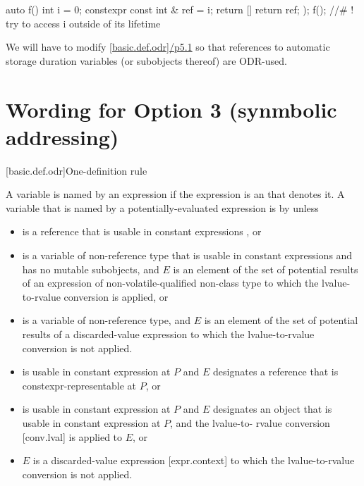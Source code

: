 \documentclass{wg21}
\begin{document}
\begin{colorblock}
auto f() {
    int i = 0;
    constexpr const int & ref = i;
    return [] {
        return ref;
    });
}
f(); //# ! try to access i outside of its lifetime
\end{colorblock}

We will have to modify \href{http://eel.is/c++draft/basic.def.odr#5.1}{[basic.def.odr]/p5.1} so that  references to automatic storage duration variables (or subobjects thereof) are ODR-used.


\section{Wording for Option 3 (synmbolic addressing)}

[basic.def.odr]{One-definition rule}%


\label{term.odr.use}%
A variable is named by an expression
if the expression is an  that denotes it.
A variable  that is named by a
potentially-evaluated expression 
is  by  unless
\begin{removedblock}
\begin{itemize}
    \item
     is a reference that is
    usable in constant expressions , or
    \item
     is a variable of non-reference type that is
    usable in constant expressions and has no mutable subobjects, and
    $E$ is an element of the set of potential results of an expression
    of non-volatile-qualified non-class type
    to which the lvalue-to-rvalue conversion  is applied, or
    \item
     is a variable of non-reference type, and
    $E$ is an element of the set of potential results
    of a discarded-value expression 
    to which the lvalue-to-rvalue conversion is not applied.
\end{itemize}
\end{removedblock}

\begin{addedblock}
\begin{itemize}
\item
{} is usable in constant expression at $P$ and $E$ designates a reference that is constexpr-representable at $P$, or
\item
{} is usable in constant expression at $P$ and $E$ designates an object that is usable in constant expression at $P$, and the lvalue-to-
rvalue conversion [conv.lval] is applied to $E$, or
\item
$E$ is a discarded-value expression [expr.context] to which the lvalue-to-rvalue
conversion is not applied.
\end{itemize}
\end{addedblock}
\end{document}
